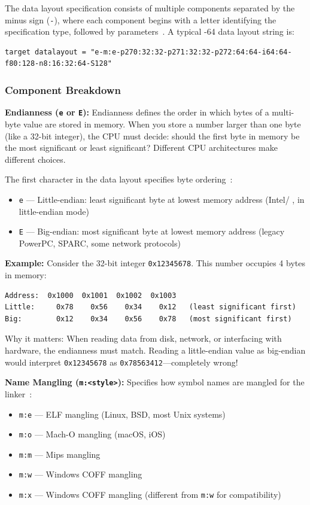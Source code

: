 The data layout specification consists of multiple components separated by the minus sign (\texttt{-}), where each component begins with a letter identifying the specification type, followed by parameters~\cite{llvmlangref}. A typical -64 data layout string is:

\begin{lstlisting}[style=ir]
target datalayout = "e-m:e-p270:32:32-p271:32:32-p272:64:64-i64:64-f80:128-n8:16:32:64-S128"
\end{lstlisting}

\subsubsection*{Component Breakdown}

\textbf{Endianness (\texttt{e} or \texttt{E}):} Endianness defines the order in which bytes of a multi-byte value are stored in memory. When you store a number larger than one byte (like a 32-bit integer), the CPU must decide: should the first byte in memory be the most significant or least significant? Different CPU architectures make different choices.

The first character in the data layout specifies byte ordering~\cite{llvmlangref}:
\begin{itemize}[noitemsep]
  \item \texttt{e} --- Little-endian: least significant byte at lowest memory address (Intel/ ,  in little-endian mode)
  \item \texttt{E} --- Big-endian: most significant byte at lowest memory address (legacy PowerPC, SPARC, some network protocols)
\end{itemize}

\textbf{Example:} Consider the 32-bit integer \texttt{0x12345678}. This number occupies 4 bytes in memory:

\begin{lstlisting}[style=ir]
Address:  0x1000  0x1001  0x1002  0x1003
Little:     0x78    0x56    0x34    0x12   (least significant first)
Big:        0x12    0x34    0x56    0x78   (most significant first)
\end{lstlisting}

Why it matters: When reading data from disk, network, or interfacing with hardware, the endianness must match. Reading a little-endian value as big-endian would interpret \texttt{0x12345678} as \texttt{0x78563412}---completely wrong!

\textbf{Name Mangling (\texttt{m:<style>}):} Specifies how symbol names are mangled for the linker~\cite{llvmlangref}:
\begin{itemize}[noitemsep]
  \item \texttt{m:e} --- ELF mangling (Linux, BSD, most Unix systems)
  \item \texttt{m:o} --- Mach-O mangling (macOS, iOS)
  \item \texttt{m:m} --- Mips mangling
  \item \texttt{m:w} --- Windows COFF mangling
  \item \texttt{m:x} --- Windows COFF  mangling (different from \texttt{m:w} for compatibility)
\end{itemize}

